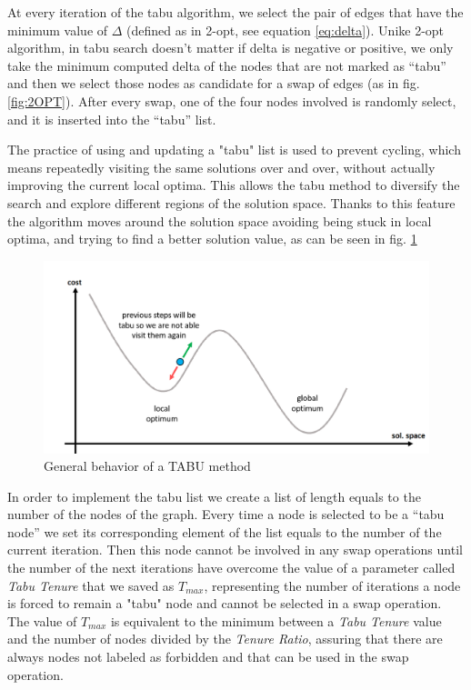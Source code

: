 At every iteration of the tabu algorithm, we select the pair of edges that have the minimum value of $\Delta$ (defined as in 2-opt, see equation \ref{eq:delta}). Unike 2-opt algorithm, in tabu search doesn't matter if delta is negative or positive, we only take the minimum computed delta of the nodes that are not marked as “tabu” and then we select those nodes as candidate for a swap of edges (as in fig.\ref{fig:2OPT}).  After every swap, one of the four nodes involved is randomly select, and it is inserted into the “tabu” list.

The practice of using and updating a "tabu" list is used to prevent cycling, which means repeatedly visiting the same solutions over and over, without actually improving the current local optima. This allows the tabu method to diversify the search and explore different regions of the solution space. Thanks to this feature the algorithm moves around the solution space avoiding being stuck in local optima, and trying to find a better solution value, as can be seen in fig. \ref{fig:TABU}

\begin{figure}[!h]
    \centering
    \includegraphics[width = \textwidth]{images/tabu.png}
    \caption{General behavior of a TABU method}
    \label{fig:TABU}
\end{figure}

In order to implement the tabu list we create a list of length equals to the number of the nodes of the graph. Every time a node is selected to be a “tabu node” we set its corresponding element of the list equals to the number of the current iteration. Then this node cannot be involved in any swap operations until the number of the next iterations have overcome the value of a parameter called \textit{Tabu Tenure} that we saved as $T_{max}$, representing the number of iterations a node is forced to remain a "tabu" node and cannot be selected in a swap operation.
The value of $T_{max}$ is equivalent to the minimum between a \textit{Tabu Tenure} value and the number of nodes divided by the \textit{Tenure Ratio}, assuring that there are always nodes not labeled as forbidden and that can be used in the swap operation.

